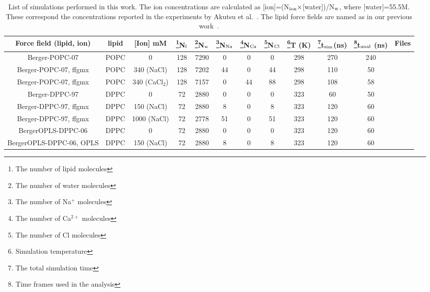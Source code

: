 \documentclass[pre,aps,floatfix,authordate1-4,twocolumn]{revtex4-1}
\begin{document}
\begin{table}[htb]
\centering
\caption{List of simulations performed in this work. The ion concentrations are calculated as 
   [ion]=(N$_{\rm ion} \times$[water])/N$_{\rm w}$, where [water]=55.5M. 
   These correspond the concentrations reported in the experiments by Akutsu et al.~\cite{akutsu81}.
   The lipid force fields are named as in our previous work~\cite{botan15}.}\label{IONsystems}
\begin{tabular}{c c c c c c c c c c c c}
  Force field (lipid, ion)& lipid & [Ion] mM & \footnote{The number of lipid molecules}N$_{\rm l}$   &  \footnote{The number of water molecules}N$_{\rm w}$   & \footnote{The number of Na$^+$ molecules}N$_{\rm Na}$  & \footnote{The number of Ca$^{2+}$ molecules}N$_{\rm Ca}$   &  \footnote{The number of Cl molecules}N$_{\rm Cl}$ & \footnote{Simulation temperature}T (K)  & \footnote{The total simulation time}t$_{{\rm sim}}$(ns) & \footnote{Time frames used in the analysis}t$_{{\rm anal}}$ (ns) & Files\\
  \hline
  Berger-POPC-07\cite{ollila07a}   &   POPC & 0          & 128 & 7290 & 0  & 0  & 0 & 298  & 270 & 240 & \cite{bergerFILESpopc}  \\
  Berger-POPC-07\cite{ollila07a}, ffgmx\cite{straatsma88}  &   POPC & 340 (NaCl) & 128 & 7202 & 44  & 0  & 44 &298  & 110 & 50 & \cite{bergerPOPC340mMNaClfiles} \\
  Berger-POPC-07\cite{ollila07a}, ffgmx\cite{straatsma88}  &   POPC & 340 (CaCl$_2$) & 128 & 7157 & 0 & 44  & 88 &298 & 108 & 58 &\cite{bergerPOPC340mMCaClfiles}  \\
  \hline
  Berger-DPPC-97\cite{marrink98}   &   DPPC & 0 & 72 & 2880 & 0  & 0  & 0 &323  & 60 & 50 &\cite{bergerDPPCfiles} \\
  Berger-DPPC-97\cite{marrink98}, ffgmx\cite{straatsma88}   &   DPPC & 150 (NaCl) & 72 & 2880 & 8  & 0  & 8 &323  & 120 & 60 &\cite{bergerDPPC150mMfiles} \\
  Berger-DPPC-97\cite{marrink98}, ffgmx\cite{straatsma88}   &   DPPC & 1000 (NaCl) & 72 & 2778 & 51  & 0  & 51 &323  & 120 & 60 &\cite{bergerDPPC1000mMfiles} \\
  \hline
  BergerOPLS-DPPC-06\cite{tieleman06} &   DPPC & 0 & 72 & 2880 & 0  & 0  & 0 &323  & 120 & 60 &\cite{bergerOPLSDPPCfiles} \\
  BergerOPLS-DPPC-06\cite{tieleman06}, OPLS\cite{aqvist90} &   DPPC & 150 (NaCl) & 72 & 2880 & 8  & 0  & 8 &323  & 120 & 60 &\cite{bergerOPLSDPPCfiles150mMnacl} \\

\end{tabular}
\end{table}
\end{document}
